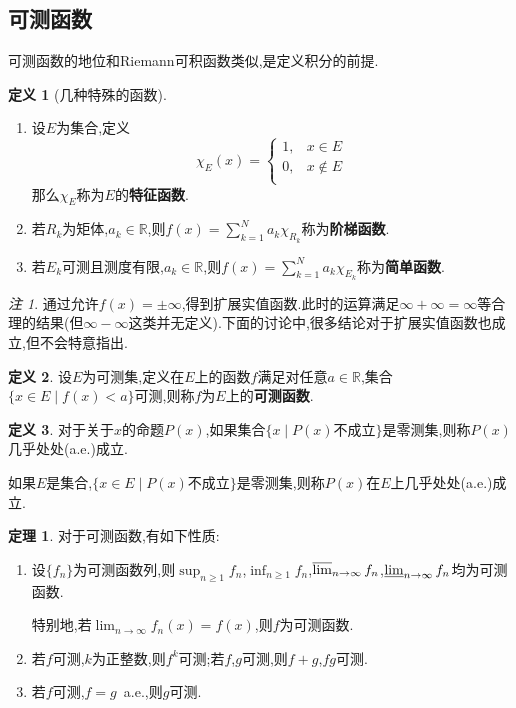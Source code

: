 \documentclass{ctexart}
\theoremstyle{definition}
\newtheorem{definition}{定义}
\newtheorem{theorem}{定理}
\theoremstyle{remark}
\newtheorem*{remark}{注}
\begin{document}
	\subsection{可测函数}
	可测函数的地位和Riemann可积函数类似,是定义积分的前提.
	
	\begin{definition}[几种特殊的函数]
		\hspace*{\fill}
		
		\begin{enumerate}
			\item 设$E$为集合,定义
			\begin{equation*}
				\chi_E(x)=
				\begin{cases}
					1, & x\in E \\
					0, & x\notin E \\
				\end{cases}
			\end{equation*}
			那么$\chi_E$称为$E$的\textbf{特征函数}.
			\item 若$R_k$为矩体,$a_k\in\mathbb{R}$,则$f(x)=\sum_{k=1}^N{a_k\chi_{R_k}}$称为\textbf{阶梯函数}.
			\item 若$E_k$可测且测度有限,$a_k\in\mathbb{R}$,则$f(x)=\sum_{k=1}^N{a_k\chi_{E_k}}$称为\textbf{简单函数}.
		\end{enumerate}
	\end{definition}
	
	\begin{remark}
		通过允许$f(x)=\pm\infty$,得到扩展实值函数.此时的运算满足$\infty+\infty=\infty$等合理的结果(但$\infty-\infty$这类并无定义).下面的讨论中,很多结论对于扩展实值函数也成立,但不会特意指出.
	\end{remark}
	
	\begin{definition}
		设$E$为可测集,定义在$E$上的函数$f$满足对任意$a\in\mathbb{R}$,集合$\{x\in E\mid f(x)<a\}$可测,则称$f$为$E$上的\textbf{可测函数}.
	\end{definition}
	\begin{definition}
		对于关于$x$的命题$P(x)$,如果集合$\{x\mid P(x)\mbox{不成立}\}$是零测集,则称$P(x)$几乎处处(a.e.)成立.
		
		如果$E$是集合,$\{x\in E\mid P(x)\mbox{不成立}\}$是零测集,则称$P(x)$在$E$上几乎处处(a.e.)成立.
	\end{definition}
	\begin{theorem}
		对于可测函数,有如下性质:
		\begin{enumerate}
			\item 设$\{f_n\}$为可测函数列,则$\sup_{n\ge 1}{f_n}$,$\inf_{n\ge 1}{f_n}$,$\varlimsup_{n\to\infty}{f_n}$,$\varliminf_{n\to\infty}{f_n}$均为可测函数.
			
			特别地,若$\lim_{n\to\infty}{f_n(x)}=f(x)$,则$f$为可测函数.
			\item 若$f$可测,$k$为正整数,则$f^k$可测;若$f$,$g$可测,则$f+g$,$fg$可测.
			\item 若$f$可测,$f=g$\ a.e.,则$g$可测.
		\end{enumerate}
	\end{theorem}
	
\end{document}
